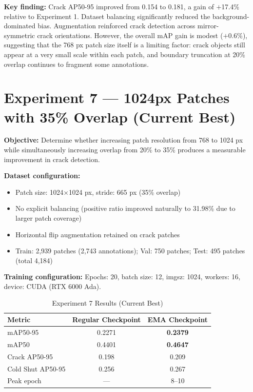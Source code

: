 \begin{findingbox}
\textbf{Key finding:} Crack AP50-95 improved from 0.154 to 0.181, a gain of $+$17.4\% relative to Experiment 1. Dataset balancing significantly reduced the background-dominated bias. Augmentation reinforced crack detection across mirror-symmetric crack orientations. However, the overall mAP gain is modest ($+$0.6\%), suggesting that the 768 px patch size itself is a limiting factor: crack objects still appear at a very small scale within each patch, and boundary truncation at 20\% overlap continues to fragment some annotations.
\end{findingbox}

\section{Experiment 7 --- 1024px Patches with 35\% Overlap (Current Best)}

\textbf{Objective:} Determine whether increasing patch resolution from 768 to 1024 px while simultaneously increasing overlap from 20\% to 35\% produces a measurable improvement in crack detection.

\textbf{Dataset configuration:}
\begin{itemize}[leftmargin=2em]
    \item Patch size: 1024$\times$1024 px, stride: 665 px (35\% overlap)
    \item No explicit balancing (positive ratio improved naturally to 31.98\% due to larger patch coverage)
    \item Horizontal flip augmentation retained on crack patches
    \item Train: 2,939 patches (2,743 annotations); Val: 750 patches; Test: 495 patches (total 4,184)
\end{itemize}

\textbf{Training configuration:} Epochs: 20, batch size: 12, imgsz: 1024, workers: 16, device: CUDA (RTX 6000 Ada).

\begin{table}[H]
\centering
\caption{Experiment 7 Results (Current Best)}
\begin{tabular}{lcc}
\toprule
\rowcolor{tableHeader}\tableheadfont Metric & \tableheadfont Regular Checkpoint & \tableheadfont EMA Checkpoint \\
\midrule
mAP50-95          & 0.2271 & \textbf{0.2379} \\
\rowcolor{tableRowAlt}mAP50             & 0.4401 & \textbf{0.4647} \\
Crack AP50-95     & 0.198  & 0.209 \\
\rowcolor{tableRowAlt}Cold Shut AP50-95 & 0.256  & 0.267 \\
Peak epoch        & ---    & 8--10 \\
\bottomrule
\end{tabular}
\end{table}

